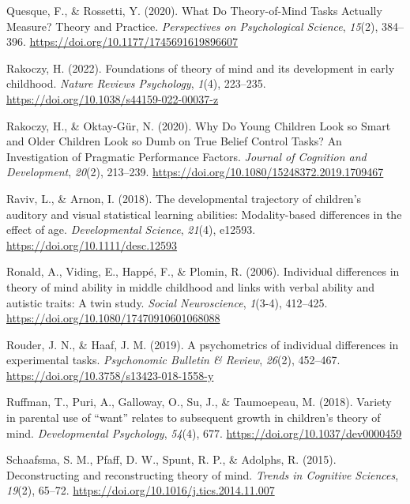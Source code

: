 \documentclass[
]{scrbook}
\newlength{\cslhangindent}
\newenvironment{CSLReferences}[2] %
 {\begin{list}{}{%
  \setlength{\itemindent}{0pt}
  \setlength{\leftmargin}{0pt}
  \setlength{\parsep}{0pt}
  \ifodd #1
   \setlength{\leftmargin}{\cslhangindent}
   \setlength{\itemindent}{-1\cslhangindent}
  \fi
  \setlength{\itemsep}{#2\baselineskip}}}
 {\end{list}}
\begin{document}
\begin{CSLReferences}{1}{0}
Quesque, F., \& Rossetti, Y. (2020). What {Do Theory-of-Mind Tasks Actually Measure}? {Theory} and {Practice}. \emph{Perspectives on Psychological Science}, \emph{15}(2), 384--396. \url{https://doi.org/10.1177/1745691619896607}

Rakoczy, H. (2022). Foundations of theory of mind and its development in early childhood. \emph{Nature Reviews Psychology}, \emph{1}(4), 223--235. \url{https://doi.org/10.1038/s44159-022-00037-z}

Rakoczy, H., \& Oktay-Gür, N. (2020). Why {Do Young Children Look} so {Smart} and {Older Children Look} so {Dumb} on {True Belief Control Tasks}? {An Investigation} of {Pragmatic Performance Factors}. \emph{Journal of Cognition and Development}, \emph{20}(2), 213--239. \url{https://doi.org/10.1080/15248372.2019.1709467}

Raviv, L., \& Arnon, I. (2018). The developmental trajectory of children's auditory and visual statistical learning abilities: Modality-based differences in the effect of age. \emph{Developmental Science}, \emph{21}(4), e12593. \url{https://doi.org/10.1111/desc.12593}

Ronald, A., Viding, E., Happé, F., \& Plomin, R. (2006). Individual differences in theory of mind ability in middle childhood and links with verbal ability and autistic traits: {A} twin study. \emph{Social Neuroscience}, \emph{1}(3-4), 412--425. \url{https://doi.org/10.1080/17470910601068088}

Rouder, J. N., \& Haaf, J. M. (2019). A psychometrics of individual differences in experimental tasks. \emph{Psychonomic Bulletin \& Review}, \emph{26}(2), 452--467. \url{https://doi.org/10.3758/s13423-018-1558-y}

Ruffman, T., Puri, A., Galloway, O., Su, J., \& Taumoepeau, M. (2018). Variety in parental use of {``want''} relates to subsequent growth in children's theory of mind. \emph{Developmental Psychology}, \emph{54}(4), 677. \url{https://doi.org/10.1037/dev0000459}

Schaafsma, S. M., Pfaff, D. W., Spunt, R. P., \& Adolphs, R. (2015). Deconstructing and reconstructing theory of mind. \emph{Trends in Cognitive Sciences}, \emph{19}(2), 65--72. \url{https://doi.org/10.1016/j.tics.2014.11.007}


\end{CSLReferences}
\end{document}
